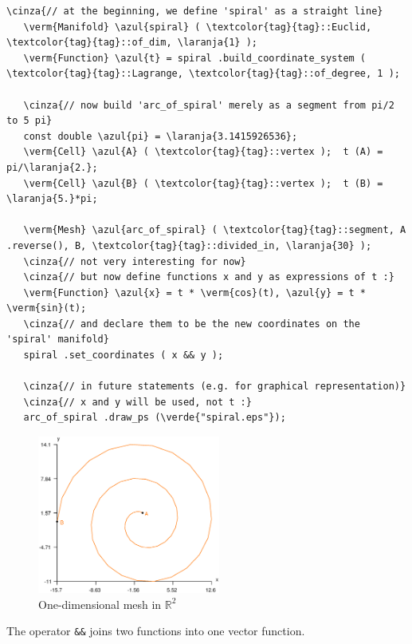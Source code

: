 \begin{Verbatim}[commandchars=\\\{\},formatcom=\small\tt,frame=single,
   label=parag-\ref{\numb section 2.\numb parag 14}.cpp,rulecolor=\color{coment},
   baselinestretch=0.94,framesep=2mm]
   \cinza{// at the beginning, we define 'spiral' as a straight line}
   \verm{Manifold} \azul{spiral} ( \textcolor{tag}{tag}::Euclid, \textcolor{tag}{tag}::of_dim, \laranja{1} );
   \verm{Function} \azul{t} = spiral .build_coordinate_system ( \textcolor{tag}{tag}::Lagrange, \textcolor{tag}{tag}::of_degree, 1 );

   \cinza{// now build 'arc_of_spiral' merely as a segment from pi/2 to 5 pi}
   const double \azul{pi} = \laranja{3.1415926536};
   \verm{Cell} \azul{A} ( \textcolor{tag}{tag}::vertex );  t (A) = pi/\laranja{2.};
   \verm{Cell} \azul{B} ( \textcolor{tag}{tag}::vertex );  t (B) = \laranja{5.}*pi;

   \verm{Mesh} \azul{arc_of_spiral} ( \textcolor{tag}{tag}::segment, A .reverse(), B, \textcolor{tag}{tag}::divided_in, \laranja{30} );
   \cinza{// not very interesting for now}
   \cinza{// but now define functions x and y as expressions of t :}
   \verm{Function} \azul{x} = t * \verm{cos}(t), \azul{y} = t * \verm{sin}(t);
   \cinza{// and declare them to be the new coordinates on the 'spiral' manifold}
   spiral .set_coordinates ( x && y );

   \cinza{// in future statements (e.g. for graphical representation)}
   \cinza{// x and y will be used, not t :}
   arc_of_spiral .draw_ps (\verde{"spiral.eps"});
\end{Verbatim}

\begin{figure}[ht] \centering
  \includegraphics[width=60mm]{spiral}
  \caption{One-dimensional mesh in $ {\mathbb R}^2 $}
\end{figure}

The operator {\small\tt \&\&} joins two functions into one vector function.

